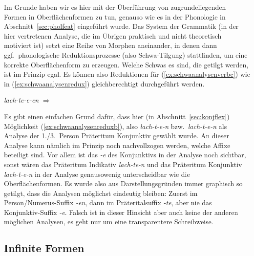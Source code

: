 Im Grunde haben wir es hier mit der Überführung von zugrundeliegenden Formen in Oberflächenformen zu tun, genauso wie es in der Phonologie in Abschnitt~\ref{sec:pholfeat} eingeführt wurde.
Das System der Grammatik (in der hier vertretenen Analyse, die im Übrigen praktisch und nicht theoretisch motiviert ist) setzt eine Reihe von Morphen aneinander, in denen dann ggf.\ phonologische Reduktionsprozesse (also Schwa-Tilgung) stattfinden, um eine korrekte Oberflächenform zu erzeugen.
Welche Schwas es sind, die getilgt werden, ist im Prinzip egal.
Es können also Reduktionen für (\ref{ex:schwaanalysenverbc}) wie in (\ref{ex:schwaanalysenredux}) gleichberechtigt durchgeführt werden.

\begin{exe}
  \ex\label{ex:schwaanalysenredux} \textit{lach-te-e-en} $\Rightarrow$
  \begin{xlist}
  \end{xlist}
\end{exe}

Es gibt einen einfachen Grund dafür, dass hier (in Abschnitt~\ref{sec:konjflex}) Möglichkeit (\ref{ex:schwaanalysenreduxb}), also \textit{lach-t-e-n} bzw.\ \textit{lach-t-e-n} als Analyse der 1.\slash 3.\ Person Präteritum Konjunktiv gewählt wurde.
An dieser Analyse kann nämlich im Prinzip noch nachvollzogen werden, welche Affixe beteiligt sind.
Vor allem ist das \textit{-e} des Konjunktivs in der Analyse noch sichtbar, sonst wären das Präteritum Indikativ \textit{lach-te-n} und das Präteritum Konjunktiv \textit{lach-t-e-n} in der Analyse genausowenig unterscheidbar wie die Oberflächenformen.
Es wurde also aus Darstellungsgründen immer graphisch so getilgt, dass die Analysen möglichst eindeutig bleiben:
Zuerst im Person\slash Numerus-Suffix \textit{-en}, dann im Präteritalsuffix \textit{-te}, aber nie das Konjunktiv-Suffix \textit{-e}.
Falsch ist in dieser Hinsicht aber auch keine der anderen möglichen Analysen, es geht nur um eine transparentere Schreibweise.

\subsection{Infinite Formen}

\label{sec:infinflex}


